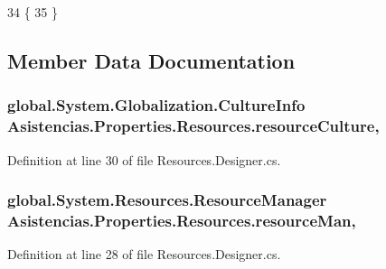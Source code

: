 \begin{DoxyCode}
34         \{
35         \}
\end{DoxyCode}


\subsection{Member Data Documentation}
\hypertarget{class_asistencias_1_1_properties_1_1_resources_a7a03e09e50212d5a8a00524a6b95b5f0}{
\subsubsection[{resource\-Culture}]{\setlength{\rightskip}{0pt plus 5cm}global.\-System.\-Globalization.\-Culture\-Info Asistencias.\-Properties.\-Resources.\-resource\-Culture\hspace{0.3cm}{\ttfamily [static]}, {\ttfamily [private]}}}\label{class_asistencias_1_1_properties_1_1_resources_a7a03e09e50212d5a8a00524a6b95b5f0}


Definition at line 30 of file Resources.\-Designer.\-cs.

\hypertarget{class_asistencias_1_1_properties_1_1_resources_a365a3dbd6022fa25d3acd62dce067cd4}{
\subsubsection[{resource\-Man}]{\setlength{\rightskip}{0pt plus 5cm}global.\-System.\-Resources.\-Resource\-Manager Asistencias.\-Properties.\-Resources.\-resource\-Man\hspace{0.3cm}{\ttfamily [static]}, {\ttfamily [private]}}}\label{class_asistencias_1_1_properties_1_1_resources_a365a3dbd6022fa25d3acd62dce067cd4}


Definition at line 28 of file Resources.\-Designer.\-cs.



